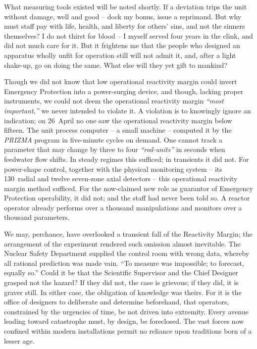 \documentclass[openright]{bookest}
\begin{document}
What measuring tools existed will be noted shortly. If a deviation trips the unit without damage, well and good -- dock my bonus, issue a reprimand. But why must staff pay with life, health, and liberty for others' sins, and not the sinners themselves? I do not thirst for blood -- I myself served four years in the clink, and did not much care for it. But it frightens me that the people who designed an apparatus wholly unfit for operation still will not admit it, and, after a light shake-up, go on doing the same. What else will they yet gift to mankind?

Though we did not know that low operational reactivity margin could invert Emergency Protection into a power-surging device, and though, lacking proper instruments, we could not deem the operational reactivity margin \textit{``most important,''} we never intended to violate it. A violation is to knowingly ignore an indication; on 26~April no one saw the operational reactivity margin below fifteen. The unit process computer -- a small machine -- computed it by the \textit{PRIZMA} program in five-minute cycles on demand. One cannot track a parameter that may change by three to four \textit{``rod-units''} in seconds when feedwater flow shifts. In steady regimes this sufficed; in transients it did not. For power-shape control, together with the physical monitoring system -- its \num{130}~radial and twelve seven-zone axial detectors -- this operational reactivity margin method sufficed. For the now-claimed new role as guarantor of Emergency Protection operability, it did not; and the staff had never been told so. A reactor operator already performs over a thousand manipulations and monitors over a thousand parameters.

We may, perchance, have overlooked a transient fall of the Reactivity Margin; the arrangement of the experiment rendered such omission almost inevitable. The Nuclear Safety Department supplied the control room with wrong data, whereby all rational prediction was made vain. ``To measure was impossible; to forecast, equally so.'' Could it be that the Scientific Supervisor and the Chief Designer grasped not the hazard? If they did not, the case is grievous; if they did, it is graver still. In either case, the obligation of knowledge was theirs. For it is the office of designers to deliberate and determine beforehand, that operators, constrained by the urgencies of time, be not driven into extremity. Every avenue leading toward catastrophe must, by design, be foreclosed. The vast forces now confined within modern installations permit no reliance upon traditions born of a lesser age.
\end{document}
